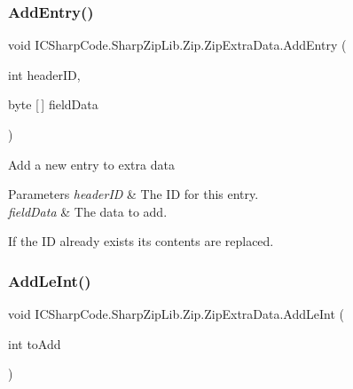\subsubsection{\texorpdfstring{Add\+Entry()}{AddEntry()}\hspace{0.1cm}{\footnotesize\ttfamily [4/4]}}
{\footnotesize\ttfamily void I\+C\+Sharp\+Code.\+Sharp\+Zip\+Lib.\+Zip.\+Zip\+Extra\+Data.\+Add\+Entry (\begin{DoxyParamCaption}\item[{int}]{header\+ID,  }\item[{byte \mbox{[}$\,$\mbox{]}}]{field\+Data }\end{DoxyParamCaption})\hspace{0.3cm}{\ttfamily [inline]}}



Add a new entry to extra data 


\begin{DoxyParams}{Parameters}
{\em header\+ID} & The ID for this entry.\\
\hline
{\em field\+Data} & The data to add.\\
\hline
\end{DoxyParams}


If the ID already exists its contents are replaced.\mbox{\label{class_i_c_sharp_code_1_1_sharp_zip_lib_1_1_zip_1_1_zip_extra_data_ac688733a0684d0e2a32da357d444212a}} 
\subsubsection{\texorpdfstring{Add\+Le\+Int()}{AddLeInt()}\hspace{0.1cm}{\footnotesize\ttfamily [1/2]}}
{\footnotesize\ttfamily void I\+C\+Sharp\+Code.\+Sharp\+Zip\+Lib.\+Zip.\+Zip\+Extra\+Data.\+Add\+Le\+Int (\begin{DoxyParamCaption}\item[{int}]{to\+Add }\end{DoxyParamCaption})\hspace{0.3cm}{\ttfamily [inline]}}



